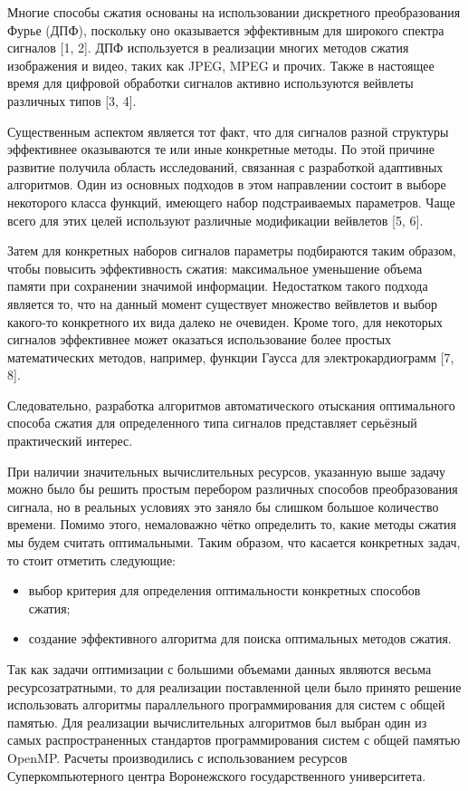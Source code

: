 \documentclass[11pt, oneside, a4paper]{article}
\begin{document}
Многие способы сжатия основаны на использовании дискретного преобразования Фурье (ДПФ), поскольку оно оказывается эффективным для широкого спектра сигналов [1, 2]. ДПФ используется в реализации многих методов сжатия изображения и видео, таких как JPEG, MPEG и прочих. Также в настоящее время для цифровой обработки сигналов активно используются вейвлеты различных типов [3, 4].

Существенным аспектом является тот факт, что для сигналов разной структуры эффективнее оказываются те или иные конкретные методы. По этой причине развитие получила область исследований, связанная с разработкой адаптивных алгоритмов. Один из основных подходов в этом направлении состоит в выборе некоторого класса функций, имеющего набор подстраиваемых параметров. Чаще всего для этих целей используют различные модификации вейвлетов [5, 6]. 

Затем для конкретных наборов сигналов параметры подбираются таким образом, чтобы повысить эффективность сжатия: максимальное уменьшение объема памяти при сохранении значимой информации. 
Недостатком такого подхода является то, что на данный момент существует множество вейвлетов и выбор какого-то конкретного их вида далеко не очевиден. Кроме того, для некоторых сигналов эффективнее может оказаться использование более простых математических методов, например, функции Гаусса для электрокардиограмм [7, 8].

Следовательно, разработка алгоритмов автоматического отыскания оптимального способа сжатия для определенного типа сигналов представляет серьёзный практический интерес. 

При наличии значительных вычислительных ресурсов, указанную выше задачу можно было бы решить простым перебором различных способов преобразования сигнала, но в реальных условиях это заняло бы слишком большое количество времени. Помимо этого, немаловажно чётко определить то, какие методы сжатия мы будем считать оптимальными. Таким образом, что касается конкретных задач, то стоит отметить следующие:
\begin{itemize}
\item выбор критерия для определения оптимальности конкретных способов сжатия;
\item создание эффективного алгоритма для поиска оптимальных методов сжатия.
\end{itemize}

Так как задачи оптимизации с большими объемами данных являются весьма  ресурсозатратными, то для реализации поставленной цели было принято решение использовать алгоритмы параллельного программирования для систем с общей памятью. Для реализации вычислительных алгоритмов был выбран один из самых распространенных стандартов программирования систем с общей памятью OpenMP. Расчеты производились с использованием ресурсов Суперкомпьютерного центра Воронежского государственного университета.
\end{document}
